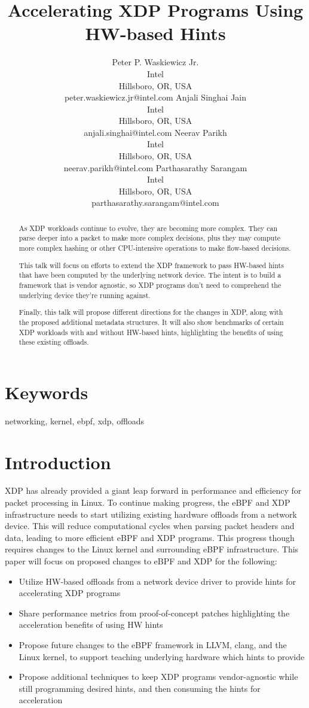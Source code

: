 \documentclass[letterpaper]{article}
\title{Accelerating XDP Programs Using HW-based Hints}
\author{Peter P. Waskiewicz Jr. \\ Intel \\ Hillsboro, OR, USA \\ peter.waskiewicz.jr@intel.com
\And Anjali Singhai Jain \\ Intel \\ Hillsboro, OR, USA \\ anjali.singhai@intel.com
\And Neerav Parikh \\ Intel \\ Hillsboro, OR, USA \\ neerav.parikh@intel.com
\And Parthasarathy Sarangam \\ Intel \\ Hillsboro, OR, USA \\ parthasarathy.sarangam@intel.com
\newline
\newline
}
\begin{document}
 
\maketitle
\begin{abstract}
As XDP workloads continue to evolve, they are becoming more complex.  They can parse deeper into a packet to make more complex decisions, plus they may compute more complex hashing or other CPU-intensive operations to make flow-based decisions.

This talk will focus on efforts to extend the XDP framework to pass HW-based hints that have been computed by the underlying network device.  The intent is to build a framework that is vendor agnostic, so XDP programs don't need to comprehend the underlying device they're running against.

Finally, this talk will propose different directions for the changes in XDP, along with the proposed additional metadata structures.  It will also show benchmarks of certain XDP workloads with and without HW-based hints, highlighting the benefits of using these existing offloads.
\end{abstract}

\section{Keywords}

networking, kernel, ebpf, xdp, offloads

\section{Introduction}
XDP has already provided a giant leap forward in performance and efficiency for packet processing in Linux. To continue making progress, the eBPF and XDP infrastructure needs to start utilizing existing hardware offloads from a network device. This will reduce computational cycles when parsing packet headers and data, leading to more efficient eBPF and XDP programs. This progress though requires changes to the Linux kernel and surrounding eBPF infrastructure.
\newline
\newline
This paper will focus on proposed changes to eBPF and XDP for the following:
\begin{itemize}
\item Utilize HW-based offloads from a network device driver to provide hints for accelerating XDP programs
\item Share performance metrics from proof-of-concept patches highlighting the acceleration benefits of using HW hints
\item Propose future changes to the eBPF framework in LLVM, clang, and the Linux kernel, to support teaching underlying hardware which hints to provide
\item Propose additional techniques to keep XDP programs vendor-agnostic while still programming desired hints, and then consuming the hints for acceleration
\end{itemize}
\end{document}
